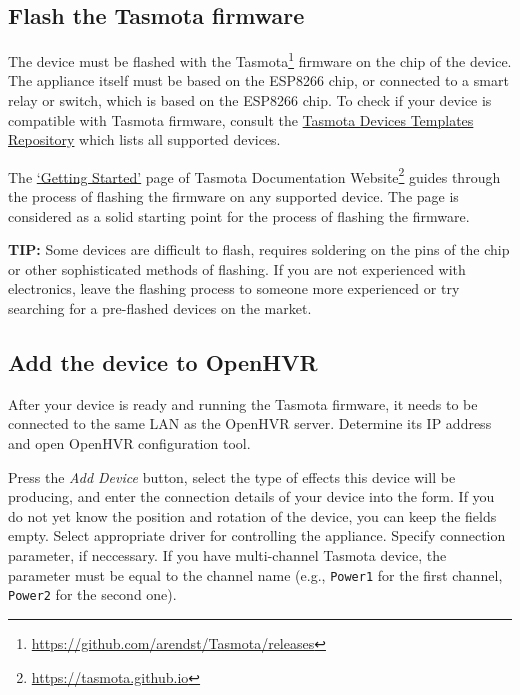 \subsection*{Flash the Tasmota firmware}

The device must be flashed with the 
Tasmota\footnote{\href{https://github.com/arendst/Tasmota/releases}{https://github.com/arendst/Tasmota/releases}}
firmware on the chip of the device.
The appliance itself must be based on the ESP8266 chip, or connected to a 
smart relay or switch, which is based on the ESP8266 chip. To check if your
device is compatible with Tasmota firmware, consult the 
\href{https://templates.blakadder.com}{Tasmota Devices Templates Repository}
which lists all supported devices.

The \href{https://tasmota.github.io/docs/Getting-Started/}{`Getting Started'}
page of Tasmota Documentation Website\footnote{
    \href{https://tasmota.github.io}{https://tasmota.github.io}}
guides through the process of flashing
the firmware on any supported device. The page is considered as a solid starting
point for the process of flashing the firmware.

\textbf{TIP:} Some devices are difficult to flash, requires soldering on the
pins of the chip or other sophisticated methods of flashing. If you are not
experienced with electronics, leave the flashing process to someone
more experienced or try searching for a pre-flashed devices on the market.

\subsection*{Add the device to OpenHVR}

After your device is ready and running the Tasmota firmware, it needs to be
connected to the same LAN as the OpenHVR server. Determine its IP address and
open OpenHVR configuration tool.

Press the \textit{Add Device} button, select the type of effects this device
will be producing, and enter the connection details of your device into
the form. If you do not yet know the position and rotation of the device, you
can keep the fields empty. Select appropriate driver for controlling the
appliance. Specify connection parameter, if neccessary. If you have multi-channel
Tasmota device, the parameter must be equal to the channel name 
(e.g., \verb|Power1| for the first channel, \verb|Power2| for the second one).